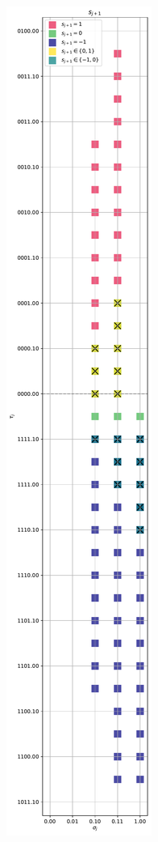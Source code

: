 \documentclass{article}
\begin{document}
\begin{figure}[htbp]
\begin{subfigure}[b]{0.32\textwidth}
    \includegraphics[width=\textwidth, height=3.5\textwidth, keepaspectratio=true]{../figures/square_root/radix2_rds_basic_quadrants_1_4.pdf}

\end{subfigure}
\end{figure}
\end{document}
